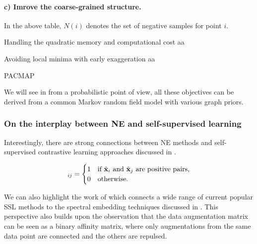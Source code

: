 \paragraph{c) Imrove the coarse-grained structure.}


In the above table, \(N(i)\) denotes the set of negative samples for point \(i\).


\begin{rem2}{Handling the quadratic memory and computational cost}
    aa
\end{rem2}

\begin{rem2}{Avoiding local minima with early exaggeration}
    aa
\end{rem2}



\begin{remark}
    PACMAP
\end{remark}


We will see in  \citep{van2022probabilistic} from a probabilistic point of view, all these objectives can be derived from a common Markov random field model with various graph priors.


\subsubsection{On the interplay between NE and self-supervised learning}
Interestingly, there are strong connections between NE methods and self-supervised contrastive learning approaches discussed in . 

\cite{wang2020understanding}
\citep{hu2022your}

\begin{align}
[\tilde{\mP}]_{ij} = 
\begin{cases}
1 & \text{if } \tilde{\vx}_i \text{ and } \tilde{\vx}_j \text{ are positive pairs,} \\
0 & \text{otherwise.}
\end{cases}
\end{align}

We can also highlight the work of \citet{balestriero2022contrastive} which connects a wide range of current popular SSL methods to the spectral embedding techniques discussed in . This perspective also builds upon the observation that the data augmentation matrix can be seen as a binary affinity matrix, where only augmentations from the same data point are connected and the others are repulsed.
